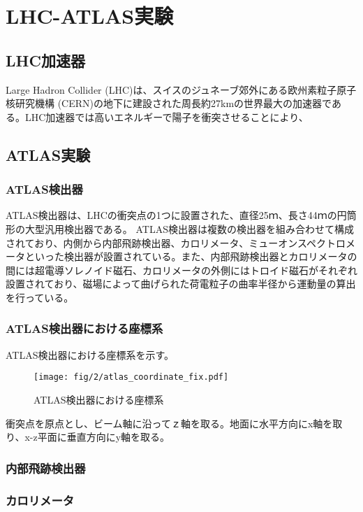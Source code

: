 \chapter{LHC-ATLAS実験}
\label{chapter2}

\section{LHC加速器}
\label{section2-1}

Large Hadron Collider (LHC)は、スイスのジュネーブ郊外にある欧州素粒子原子核研究機構 (CERN)の地下に建設された周長約27kmの世界最大の加速器である。LHC加速器では高いエネルギーで陽子を衝突させることにより、


\section{ATLAS実験}
\label{section2-2}
\subsection{ATLAS検出器}
ATLAS検出器は、LHCの衝突点の1つに設置された、直径25ｍ、長さ44ｍの円筒形の大型汎用検出器である。
ATLAS検出器は複数の検出器を組み合わせて構成されており、内側から内部飛跡検出器、カロリメータ、ミューオンスペクトロメータといった検出器が設置されている。また、内部飛跡検出器とカロリメータの間には超電導ソレノイド磁石、カロリメータの外側にはトロイド磁石がそれぞれ設置されており、磁場によって曲げられた荷電粒子の曲率半径から運動量の算出を行っている。


\subsection{ATLAS検出器における座標系}
ATLAS検出器における座標系を示す。

\begin{figure}[tb]
  \centering
  \texttt{[image: fig/2/atlas\_coordinate\_fix.pdf]}
  \caption{ATLAS検出器における座標系}
  \label{fig:a}
\end{figure}

衝突点を原点とし、ビーム軸に沿ってｚ軸を取る。地面に水平方向にx軸を取り、x-z平面に垂直方向にy軸を取る。

\subsection{内部飛跡検出器}

\subsection{カロリメータ}

